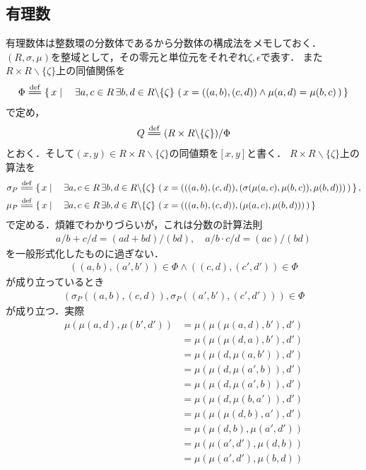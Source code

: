 \subsection{有理数}
	有理数体は整数環の分数体であるから分数体の構成法をメモしておく．
	$(R,\sigma,\mu)$を整域として，その零元と単位元をそれぞれ$\zeta,\epsilon$で表す．
	また$R \times R \backslash \{\zeta\}$上の同値関係を
	\begin{align}
		\Phi \defeq \Set{x}{\exists a,c \in R\, \exists b,d \in R \backslash \{\zeta\}\, \left(\, x=((a,b),(c,d)) \wedge \mu(a,d) = \mu(b,c)\, \right)}
	\end{align}
	で定め，
	\begin{align}
		Q \defeq (R \times R \backslash \{\zeta\}) / \Phi
	\end{align}
	とおく．そして$(x,y) \in R \times R \backslash \{\zeta\}$の同値類を$[x,y]$と書く．
	$R \times R \backslash \{\zeta\}$上の算法を
	\begin{align}
		\sigma_P &\defeq \Set{x}{\exists a,c \in R\, \exists b,d \in R \backslash \{\zeta\}\, \left(\, x=(((a,b),(c,d)),(\sigma(\mu(a,c),\mu(b,c)),\mu(b,d)))\, \right)}, \\
		\mu_P &\defeq \Set{x}{\exists a,c \in R\, \exists b,d \in R \backslash \{\zeta\}\, \left(\, x=(((a,b),(c,d)),(\mu(a,c),\mu(b,d)))\, \right)}
	\end{align}
	で定める．煩雑でわかりづらいが，これは分数の計算法則
	\begin{align}
		a/b + c/d = (ad + bd)/(bd),\quad a/b \cdot c/d = (ac)/(bd)
	\end{align}
	を一般形式化したものに過ぎない．
	\begin{align}
		((a,b),(a',b')) \in \Phi \wedge ((c,d),(c',d')) \in \Phi
	\end{align}
	が成り立っているとき
	\begin{align}
		\left(\sigma_P((a,b),(c,d)),\sigma_P((a',b'),(c',d'))\right) \in \Phi
	\end{align}
	が成り立つ．実際
	\begin{align}
		\mu(\mu(a,d),\mu(b',d')) &= \mu(\mu(\mu(a,d),b'),d') \\
		&= \mu(\mu(\mu(d,a),b'),d') \\
		&= \mu(\mu(d,\mu(a,b')),d') \\
		&= \mu(\mu(d,\mu(a',b)),d') \\
		&= \mu(\mu(d,\mu(a',b)),d') \\
		&= \mu(\mu(d,\mu(b,a')),d') \\
		&= \mu(\mu(\mu(d,b),a'),d') \\
		&= \mu(\mu(d,b),\mu(a',d')) \\
		&= \mu(\mu(a',d'),\mu(d,b)) \\
		&= \mu(\mu(a',d'),\mu(b,d)) \\
	\end{align}
